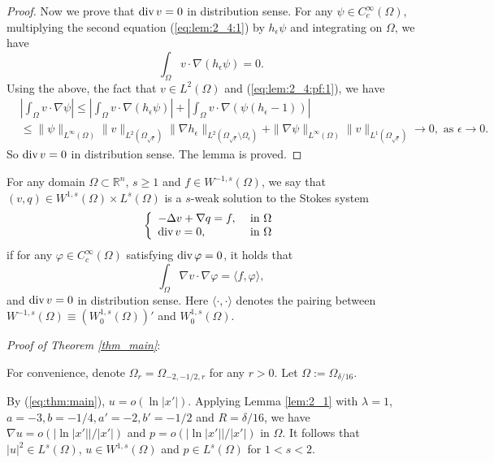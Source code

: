 \documentclass[12pt]{article}
\newcommand{\dive}{{\rm div \hspace{0.05cm} }}
\begin{document}
\begin{proof}
	Now we prove that $\dive v=0$ in distribution sense. For any $\psi\in C_c^{\infty}(\Omega)$, multiplying the second equation (\ref{eq:lem:2_4:1}) by $h_{\epsilon}\psi$ and integrating on $\Omega$, we have 
	\[
		\int_{\Omega}v\cdot \nabla (h_{\epsilon}\psi)=0.
	\]
	Using the above, the fact that $v\in L^2(\Omega)$ and (\ref{eq:lem:2_4:pf:1}), we have 
	\[
	\begin{split}
		& |\int_{\Omega}v\cdot \nabla \psi|\le |\int_{\Omega}v\cdot \nabla (h_{\epsilon}\psi)|+|\int_{\Omega}v\cdot \nabla (\psi (h_{\epsilon}-1))|\\
		& \le \|\psi\|_{L^{\infty}(\Omega)}\|v\|_{L^2(\Omega_{\sqrt{\epsilon}})}\|\nabla h_{\epsilon}\|_{L^2(\Omega_{\sqrt{\epsilon}}\setminus\Omega_{\epsilon})}+\|\nabla \psi\|_{L^{\infty}(\Omega)}\|v\|_{L^{1}(\Omega_{\sqrt{\epsilon}})}\to 0, \textrm{ as }\epsilon\to 0.
	\end{split}
	\]
	So $\dive v=0$ in distribution sense. 
	The lemma is proved. 
\end{proof}

For any domain $\Omega\subset \mathbb{R}^n$, $s\ge 1$ and $f\in W^{-1, s}(\Omega)$, 
we say that $(v, q)\in W^{1,s}(\Omega)\times L^s(\Omega)$ is a $s$-weak solution to the Stokes system 
\[
\left\{
\begin{array}{ll}
	-\Delta v+\nabla q=f, & \textrm{ in }\Omega\\
	\dive v=0, & \textrm{ in }\Omega
\end{array}
\right.
\]
if for any $\varphi\in C_c^{\infty}(\Omega)$ satisfying $\dive \varphi=0$, it holds that 
\begin{equation}
	\int_{\Omega} \nabla v\cdot \nabla \varphi= \langle f, \varphi \rangle, 
\end{equation}
and $\dive v=0$ in distribution sense. Here $\langle \cdot, \cdot\rangle$ denotes the pairing between $W^{-1, s}(\Omega)\equiv (W^{1, s}_0(\Omega))'$ and $W^{1, s}_0(\Omega)$. 

\medskip

\noindent\emph{Proof of Theorem \ref{thm_main}}: 

For convenience, denote $\Omega_r=\Omega_{-2, -1/2, r}$ for any $r>0$. Let $\Omega:=\Omega_{\delta/16}$. 

By (\ref{eq:thm:main}), $u=o(\ln |x'|)$. Applying Lemma \ref{lem:2_1} with $\lambda=1$, $a=-3, b=-1/4, a'=-2, b'=-1/2$ and $R=\delta/16$, we have $\nabla u=o(| \ln |x'||/|x'|)$ and $p=o(| \ln |x'||/|x'|)$ in $\Omega$. It follows that $|u|^2\in L^s(\Omega)$, $u\in W^{1, s}(\Omega)$ and $p\in L^s(\Omega)$ for $1<s<2$. 
\end{document}

